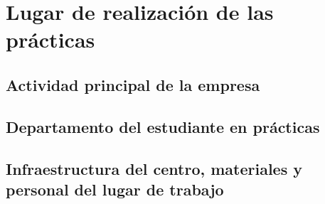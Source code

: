 \section{Lugar de realización de las prácticas}
\subsection{Actividad principal de la empresa}


\subsection{Departamento del estudiante en prácticas}


\subsection{Infraestructura del centro, materiales y personal del lugar de trabajo}


\newpage